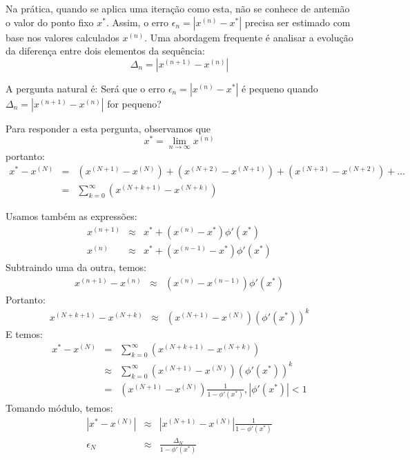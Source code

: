 Na prática, quando se aplica uma iteração como esta, não se conhece de antemão o valor do ponto fixo $x^*$. Assim, o erro $\epsilon_n=\left|x^{(n)}-x^*\right|$ precisa ser estimado com base nos valores calculados $x^{(n)}$. Uma abordagem frequente é analisar a evolução da diferença entre dois elementos da sequência:
$$\Delta_n=\left|x^{(n+1)}-x^{(n)}\right|$$

A pergunta natural é: Será que o erro $\epsilon_n=\left|x^{(n)}-x^*\right|$ é pequeno quando  $\Delta_n=\left|x^{(n+1)}-x^{(n)}\right|$ for pequeno?

Para responder a esta pergunta, observamos que
$$x^*=\lim_{n\to \infty }x^{(n)}$$
portanto:
\begin{eqnarray*}
x^*-x^{(N)}&=&  \left(x^{(N+1)}-x^{(N)}\right)+\left(x^{(N+2)}-x^{(N+1)}\right)+\left(x^{(N+3)}-x^{(N+2)}\right)+\ldots\\
&=&\sum_{k=0}^\infty \left(x^{(N+k+1)}-x^{(N+k)}\right)
\end{eqnarray*}

Usamos também as expressões:
\begin{eqnarray*}
x^{(n+1)}&\approx& x^*+(x^{(n)}-x^*) \phi'(x^*)\\
x^{(n)}&\approx& x^*+(x^{(n-1)}-x^*) \phi'(x^*)
\end{eqnarray*}
Subtraindo uma da outra, temos:
\begin{eqnarray*}
x^{(n+1)}-x^{(n)}&\approx& (x^{(n)}-x^{(n-1)}) \phi'(x^*)
\end{eqnarray*}
Portanto:
\begin{eqnarray*}
x^{(N+k+1)}-x^{(N+k)}&\approx& (x^{(N+1)}-x^{(N)}) \left(\phi'(x^*)\right)^{k}
\end{eqnarray*}
E temos:
\begin{eqnarray*}
x^*-x^{(N)}
&=&\sum_{k=0}^\infty \left(x^{(N+k+1)}-x^{(N+k)}\right)\\
&\approx&\sum_{k=0}^\infty (x^{(N+1)}-x^{(N)}) \left(\phi'(x^*)\right)^{k}\\
&=&(x^{(N+1)}-x^{(N)}) \frac{1}{1-\phi'(x^*)}, \left|\phi'(x^*)\right|<1
\end{eqnarray*}
Tomando módulo, temos:
\begin{eqnarray*}
\left|x^*-x^{(N)} \right|
&\approx&\left|x^{(N+1)}-x^{(N)}\right| \frac{1}{1-\phi'(x^*)}\\
\epsilon_N &\approx&  \frac{\Delta_N}{1-\phi'(x^*)}
\end{eqnarray*}

